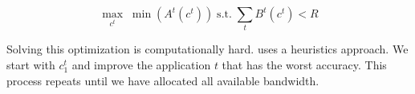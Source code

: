 \begin{equation}
  \label{eq:multitask}
  \underset{c^t}{\max} \; \min({A^t(c^t)})
  \;
  \text{s.t.}
  \;
  \sum_t{B^t(c^t)} < R
\end{equation}

Solving this optimization is computationally hard. \sysname{} uses a heuristics
approach. We start with $c_1^t$ and improve the application $t$ that has the
worst accuracy. This process repeats until we have allocated all available
bandwidth.

